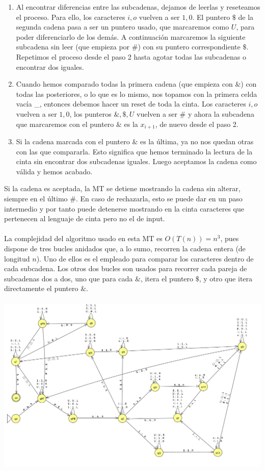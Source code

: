\documentclass[11pt, a4paper]{exam}
\begin{document}
\begin{questions}
\begin{parts}
\begin{solution}
\begin{enumerate}
                \item Al encontrar diferencias entre las subcadenas, dejamos de leerlas y reseteamos el proceso. Para ello, los caracteres $i,o$ vuelven a ser $1,0$. El puntero $\$$ de la segunda cadena pasa a ser un puntero usado, que marcaremos como $U$, para poder diferenciarlo de los demás. A continuación marcaremos la siguiente subcadena sin leer (que empieza por $\#$) con su puntero correspondiente $\$$. Repetimos el proceso desde el paso 2 hasta agotar todas las subcadenas o encontrar dos iguales.
                \item Cuando hemos comparado todas la primera cadena (que empieza con $\&$) con todas las posteriores, o lo que es lo mismo, nos topamos con la primera celda vacía \_, entonces debemos hacer un reset de toda la cinta. Los caracteres $i,o$ vuelven a ser $1,0$, los punteros $\&,\$,U$ vuelven a ser $\#$ y ahora la subcadena que marcaremos con el puntero $\&$ es la $x_{i+1}$, de nuevo desde el paso 2.
                \item Si la cadena marcada con el puntero $\&$ es la última, ya no nos quedan otras con las que compararla. Esto significa que hemos terminado la lectura de la cinta sin encontrar dos subcadenas iguales. Luego aceptamos la cadena como válida y hemos acabado.
            \end{enumerate}
            Si la cadena es aceptada, la MT se detiene mostrando la cadena sin alterar, siempre en el último $\#$. En caso de rechazarla, esto se puede dar en un paso intermedio y por tanto puede detenerse mostrando en la cinta caracteres que pertenecen al lenguaje de cinta pero no el de input.
            \\
            \\
            La complejidad del algoritmo usado en esta MT es $O(T(n)) = n^3$, pues dispone de tres bucles anidados que, a lo sumo, recorren la cadena entera (de longitud $n$). Uno de ellos es el empleado para comparar los caracteres dentro de cada subcadena. Los otros dos bucles son usados para recorrer cada pareja de subcadenas dos a dos, uno que para cada $\&$, itera el puntero $\$$, y otro que itera directamente el puntero $\&$.
            \\
            \\
            \includegraphics[width = 15 cm]{figs/M4Unicinta.png}

\end{solution}
\end{parts}
\end{questions}
\end{document}
